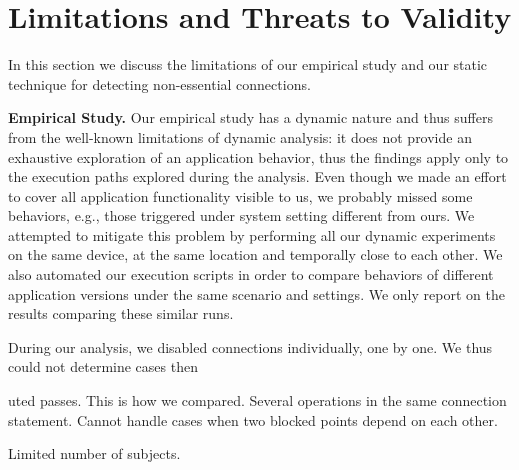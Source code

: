 \section{Limitations and Threats to Validity}
\label{sec:limitations}
In this section we discuss the limitations of our empirical study and our static technique for detecting non-essential connections.

\vspace{0.1in}
\noindent 
{\bf Empirical Study.}
Our empirical study has a dynamic nature and thus suffers from the well-known limitations of dynamic analysis: it does not provide an exhaustive exploration of an application behavior, thus the findings apply only to the execution paths explored during the analysis. 
Even though we made an effort to cover all application functionality visible to us, we probably missed some behaviors, e.g., those triggered under system setting different from ours. 
We attempted to mitigate this problem by performing all our dynamic experiments on the same device, at the same location and temporally close to each other.  
We also automated our execution scripts in order to compare behaviors of different application versions under the same scenario and settings. 
We only report on the results comparing these similar runs.  

During our analysis, we disabled connections individually, one by one. We thus could not determine cases then 

uted passes. This is how we compared. 
Several operations in the same connection statement.
Cannot handle cases when two blocked points depend on each other.

Limited number of subjects.

